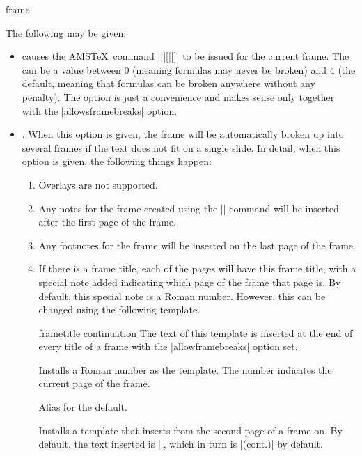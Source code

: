 \begin{environment}{{frame}}
\begin{frame}[<+->][plain]
\begin{frame}[plain]
  The following  may be given:
  \begin{itemize}
  \item
     causes the AMS\TeX\ command |\allowdisplaybreaks||[||]| to be issued for the current frame. The  can be a value between 0 (meaning formulas may never be broken) and 4 (the default, meaning that formulas can be broken anywhere without any penalty). The option is just a convenience and makes sense only together with the |allowsframebreaks| option.
  \item
    . When this option is given, the frame will be automatically broken up into several frames if the text does not fit on a single slide. In detail, when this option is given, the following things happen:
    \begin{enumerate}
    \item
      Overlays are not supported.
    \item
      Any notes for the frame created using the |\note| command will be inserted after the first page of the frame.
    \item
      Any footnotes for the frame will be inserted on the last page of the frame.
    \item
      If there is a frame title, each of the pages will have this frame title, with a special note added indicating which page of the frame that page is. By default, this special note is a Roman number. However, this can be changed using the following template.
      \begin{element}{frametitle continuation}\yes\yes\yes
        The text of this template is inserted at the end of every title of a frame with the |allowframebreaks| option set.
        \begin{templateoptions}
          Installs a Roman number as the template. The number indicates the current page of the frame.

          Alias for the default.

          Installs a template that inserts  from the second page of a frame on. By default, the text inserted is |\insertcontinuationtext|,  which  in turn is |(cont.)| by default.
          

\end{templateoptions}
\end{element}
\end{enumerate}
\end{itemize}
\end{frame}
\end{frame}
\end{environment}
